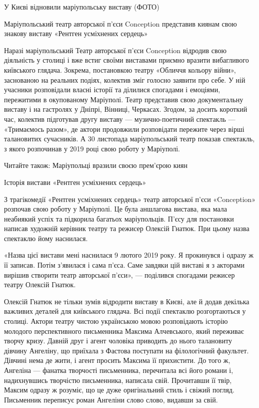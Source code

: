  
 
 
 
 

У Києві відновили маріупольську виставу (ФОТО)

Маріупольський театр авторської п'єси Conception представив киянам свою знакову
виставу «Рентген усміхнених сердець»

Наразі маріупольський Театр авторської п'єси Conception відродив свою
діяльність у столиці і вже встиг своїми виставами приємно вразити вибагливого
київського глядача. Зокрема, постановкою театру «Обличчя кольору війни»,
заснованою на реальних подіях, колектив зміг голосно заявити про себе. У ній
учасники розповідали власні історії та ділилися спогадами і емоціями,
пережитими в окупованому Маріуполі. Театр представив свою документальну виставу
і на гастролях у Дніпрі, Вінниці, Черкасах. Згодом, за досить короткий час,
колектив підготував другу виставу — музично-поетичний спектакль — «Тримаємось
разом», де актори продовжили розповідати пережите через вірші талановитих
сучасників. А 30 листопада маріупольський театр показав спектакль, з якого
розпочинав у 2019 році свою роботу у Маріуполі.

Читайте також: Маріупольці вразили своєю прем'єрою киян

Історія вистави «Рентген усміхнених сердець»

З трагікомедії «Рентген усміхнених сердець» театр авторської п'єси «Conception»
розпочав свою роботу у Маріуполі. Це була аншлагова вистава, яка мала неабиякий
успіх та підкорила багатьох маріупольців. П'єсу для постановки написав художній
керівник театру та режисер Олексій Гнатюк. При цьому назва спектаклю йому
наснилася.

«Назва цієї вистави мені наснилася 9 лютого 2019 року. Я прокинувся і одразу ж
її записав. Потім з'явилася і сама п'єса. Саме завдяки цій виставі я з акторами
вирішив створити театр авторської п'єси», — поділився спогадами режисер театру
Олексій Гнатюк.

Олексій Гнатюк не тільки зумів відродити виставу в Києві, але й додав декілька
важливих деталей для київського глядача. Всі події спектаклю розгортаються у
столиці. Актори театру чистою українською мовою розповідають історію молодого
перспективного письменника Максима Алчевського, який переживає творчу кризу.
Давній друг і агент чоловіка приводить до нього талановиту дівчину Ангеліну, що
приїхала з Фастова поступати на філологічний факультет. Дівчині нема де жити, і
агент просить Максима її прихистити. До того ж, Ангеліна — фанатка творчості
письменника, перечитала всі його романи і, надихнувшись творчістю письменника,
написала свій. Прочитавши її твір, Максим одразу ж розуміє, що це дуже
оригінальний стиль і свіжий погляд. Письменник переписує роман Ангеліни слово
слово, видавши за свій.

